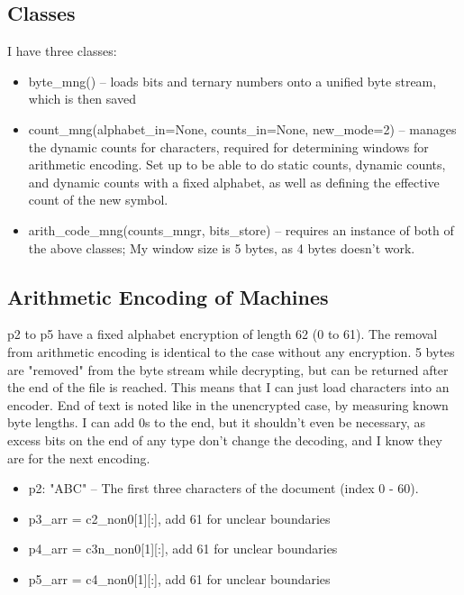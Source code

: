 \documentclass{article}
\begin{document}
\subsection{Classes}

I have three classes:

\begin{itemize}

\item byte\_mng() -- loads bits and ternary numbers onto a unified byte stream, which is then saved
\item count\_mng(alphabet\_in=None, counts\_in=None, new\_mode=2) -- manages the dynamic counts for characters, required for determining windows for arithmetic encoding. Set up to be able to do static counts, dynamic counts, and dynamic counts with a fixed alphabet, as well as defining the effective count of the new symbol.
\item arith\_code\_mng(counts\_mngr, bits\_store) -- requires an instance of both of the above classes; My window size is 5 bytes, as 4 bytes doesn't work.

\end{itemize}
 
\subsection{Arithmetic Encoding of Machines}
 
p2 to p5 have a fixed alphabet encryption of length 62 (0 to 61). The removal from arithmetic encoding is identical to the case without any encryption. 5 bytes are "removed" from the byte stream while decrypting, but can be returned after the end of the file is reached. This means that I can just load characters into an encoder. End of text is noted like in the unencrypted case, by measuring known byte lengths. I can add 0s to the end, but it shouldn't even be necessary, as excess bits on the end of any type don't change the decoding, and I know they are for the next encoding.
 
\begin{itemize}
\item p2: "ABC" -- The first three characters of the document (index 0 - 60). 
\item p3\_arr = c2\_non0[1][:], add 61 for unclear boundaries
\item p4\_arr = c3n\_non0[1][:], add 61 for unclear boundaries
\item p5\_arr = c4\_non0[1][:], add 61 for unclear boundaries
\end{itemize}
\end{document}
